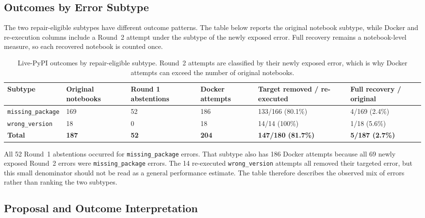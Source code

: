 \subsection{Outcomes by Error Subtype}
\label{sec:v-final-subtype-outcomes}

The two repair-eligible subtypes have different outcome patterns. The table
below reports the original notebook subtype, while Docker and re-execution
columns include a Round~2 attempt under the subtype of the newly exposed error.
Full recovery remains a notebook-level measure, so each recovered notebook is
counted once.

\begin{table}[htbp]
  \centering
  \scriptsize
  \setlength{\tabcolsep}{3pt}
  \begin{tabular}{|p{2.0cm}|p{1.3cm}|p{1.3cm}|p{1.3cm}|p{2.35cm}|p{1.9cm}|}
    \hline
    \textbf{Subtype} & \textbf{Original notebooks} & \textbf{Round 1 abstentions} & \textbf{Docker attempts} & \textbf{Target removed / re-executed} & \textbf{Full recovery / original} \tabularnewline
    \hline
    \texttt{missing\_package} & 169 & 52 & 186 & 133/166 (80.1\%) & 4/169 (2.4\%) \tabularnewline
    \hline
    \texttt{wrong\_version} & 18 & 0 & 18 & 14/14 (100\%) & 1/18 (5.6\%) \tabularnewline
    \hline
    \textbf{Total} & \textbf{187} & \textbf{52} & \textbf{204} & \textbf{147/180 (81.7\%)} & \textbf{5/187 (2.7\%)} \tabularnewline
    \hline
  \end{tabular}
  \caption{Live-PyPI outcomes by repair-eligible subtype. Round~2 attempts
  are classified by their newly exposed error, which is why Docker attempts can
  exceed the number of original notebooks.}
  \label{tab:v-subtype-outcomes}
\end{table}

All 52 Round~1 abstentions occurred for \texttt{missing\_package} errors.
That subtype also has 186 Docker attempts because all 69 newly exposed
Round~2 errors were \texttt{missing\_package} errors. The 14 re-executed
\texttt{wrong\_version} attempts all removed their targeted error, but this
small denominator should not be read as a general performance estimate. The
table therefore describes the observed mix of errors rather than ranking the
two subtypes.

\subsection{Proposal and Outcome Interpretation}
\label{sec:v-final-proposal}

